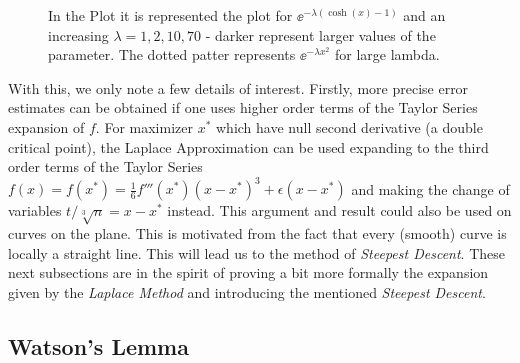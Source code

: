 	\begin{figure}[h!]
		\centering
		\caption{In the Plot it is represented the plot for $\ee^{- \lambda (\cosh(x)-1)}$ and an increasing $\lambda  = 1, 2, 10, 70$ - darker represent larger values of the parameter. The dotted patter represents $\ee^{-\lambda x^2}$ for large lambda.}
	\end{figure}
		
	With this, we only note a few details of interest. Firstly, more precise error estimates can be obtained if one uses higher order terms of the Taylor Series expansion of $f$. For maximizer $x^*$ which have null second derivative (a double critical point), the Laplace Approximation can be used expanding to the third order terms of the Taylor Series $f(x) = f(x^*) = \frac{1}{6}f'''(x^*)(x-x^*)^3 + \epsilon(x-x^*)$ and making the change of variables $t/\sqrt[3]{n} = x - x^*$ instead. This argument and result could also be used on curves on the plane. This is motivated from the fact that every (smooth) curve is locally a straight line. This will lead us to the method of \textit{Steepest Descent}. These next subsections are in the spirit of proving a bit more formally the expansion given by the \textit{Laplace Method} and introducing the mentioned \textit{Steepest Descent}.

\subsection{Watson's Lemma} 

